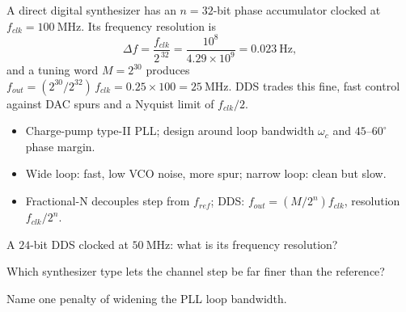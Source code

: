 \begin{workedexample}
A direct digital synthesizer has an $n = 32$-bit phase accumulator clocked
at $f_{clk} = 100\ \text{MHz}$. Its frequency resolution is
\[ \Delta f = \frac{f_{clk}}{2^{\,32}} = \frac{10^{8}}{4.29\times10^{9}} = 0.023\ \text{Hz}, \]
and a tuning word $M = 2^{30}$ produces
$f_{out} = (2^{30}/2^{32})\,f_{clk} = 0.25\times100 = 25\ \text{MHz}$. DDS trades
this fine, fast control against DAC spurs and a Nyquist limit of $f_{clk}/2$.
\end{workedexample}

\begin{keytakeaways}
\begin{itemize}[leftmargin=1.4em,itemsep=2pt]
\item Charge-pump type-II PLL; design around loop bandwidth $\omega_c$ and $45$--$60^\circ$ phase margin.
\item Wide loop: fast, low VCO noise, more spur; narrow loop: clean but slow.
\item Fractional-N decouples step from $f_{ref}$; DDS: $f_{out}=(M/2^n)f_{clk}$, resolution $f_{clk}/2^n$.
\end{itemize}
\end{keytakeaways}

\begin{exercises}
\item A $24$-bit DDS clocked at $50\ \text{MHz}$: what is its frequency resolution?
\item Which synthesizer type lets the channel step be far finer than the reference?
\item Name one penalty of widening the PLL loop bandwidth.
\end{exercises}

